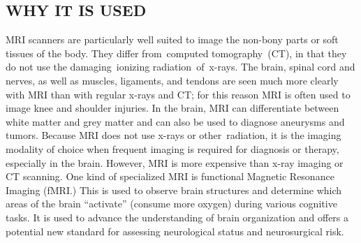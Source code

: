 \documentclass[12pt]{article}
\begin{document}
\subsection{WHY IT IS USED}
MRI scanners are particularly well suited to image the non-bony parts or soft tissues of the body. They differ from computed tomography (CT), in that they do not use the damaging ionizing radiation of x-rays. The brain, spinal cord and nerves, as well as muscles, ligaments, and tendons are seen much more clearly with MRI than with regular x-rays and CT; for this reason MRI is often used to image knee and shoulder injuries.
In the brain, MRI can differentiate between white matter and grey matter and can also be used to diagnose aneurysms and tumors. Because MRI does not use x-rays or other radiation, it is the imaging modality of choice when frequent imaging is required for diagnosis or therapy, especially in the brain. However, MRI is more expensive than x-ray imaging or CT scanning.
One kind of specialized MRI is functional Magnetic Resonance Imaging (fMRI.) This is used to observe brain structures and determine which areas of the brain “activate” (consume more oxygen) during various cognitive tasks. It is used to advance the understanding of brain organization and offers a potential new standard for assessing neurological status and neurosurgical risk.
\end{document}
